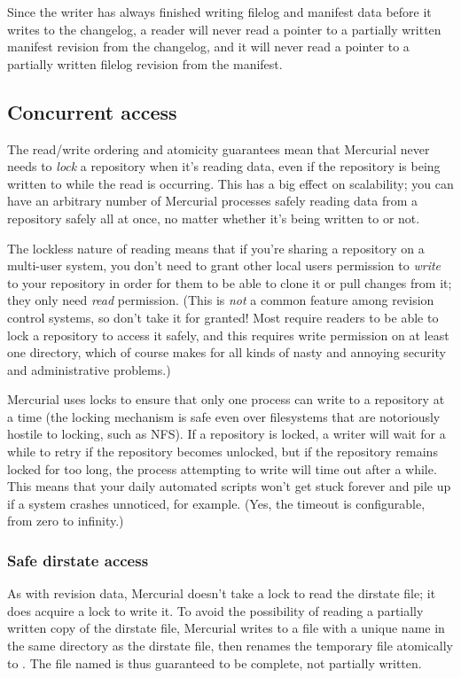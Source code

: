 Since the writer has always finished writing filelog and manifest data
before it writes to the changelog, a reader will never read a pointer
to a partially written manifest revision from the changelog, and it will
never read a pointer to a partially written filelog revision from the
manifest.

\subsection{Concurrent access}

The read/write ordering and atomicity guarantees mean that Mercurial
never needs to \emph{lock} a repository when it's reading data, even
if the repository is being written to while the read is occurring.
This has a big effect on scalability; you can have an arbitrary number
of Mercurial processes safely reading data from a repository safely
all at once, no matter whether it's being written to or not.

The lockless nature of reading means that if you're sharing a
repository on a multi-user system, you don't need to grant other local
users permission to \emph{write} to your repository in order for them
to be able to clone it or pull changes from it; they only need
\emph{read} permission.  (This is \emph{not} a common feature among
revision control systems, so don't take it for granted!  Most require
readers to be able to lock a repository to access it safely, and this
requires write permission on at least one directory, which of course
makes for all kinds of nasty and annoying security and administrative
problems.)

Mercurial uses locks to ensure that only one process can write to a
repository at a time (the locking mechanism is safe even over
filesystems that are notoriously hostile to locking, such as NFS).  If
a repository is locked, a writer will wait for a while to retry if the
repository becomes unlocked, but if the repository remains locked for
too long, the process attempting to write will time out after a while.
This means that your daily automated scripts won't get stuck forever
and pile up if a system crashes unnoticed, for example.  (Yes, the
timeout is configurable, from zero to infinity.)

\subsubsection{Safe dirstate access}

As with revision data, Mercurial doesn't take a lock to read the
dirstate file; it does acquire a lock to write it.  To avoid the
possibility of reading a partially written copy of the dirstate file,
Mercurial writes to a file with a unique name in the same directory as
the dirstate file, then renames the temporary file atomically to
.  The file named  is thus
guaranteed to be complete, not partially written.

